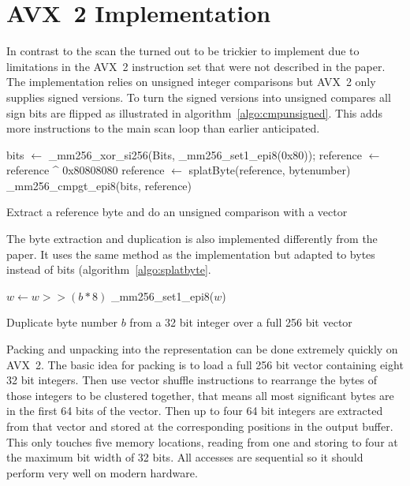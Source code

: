 \section{AVX~2 \bs{} Implementation}

In contrast to the \bwv{} scan the \bs{} turned out to be trickier to implement
due to limitations in the AVX~2 instruction set that were not described in the
\bs{} paper. The implementation relies on unsigned integer comparisons but AVX~2
only supplies signed versions. To turn the signed versions into unsigned
compares all sign bits are flipped as illustrated in
algorithm~\ref{algo:cmpunsigned}. This adds more instructions to the main scan
loop than earlier anticipated.

\begin{algorithm}[h]
\begin{algorithmic}[1]
  \State bits $\gets$ \_mm256\_xor\_si256(Bits, \_mm256\_set1\_epi8(0x80));
  \State reference $\gets$ reference \^{} 0x80808080
  \State reference $\gets$ splatByte(reference, bytenumber)
  \State \Return \_mm256\_cmpgt\_epi8(bits, reference)
  \EndProcedure
\end{algorithmic}
\caption{Extract a reference byte and do an unsigned comparison with a vector}
\label{algo:cmpunsigned}
\end{algorithm}

The byte extraction and duplication is also implemented differently from the
paper. It uses the same method as the \bwv{} implementation but adapted to bytes
instead of bits (algorithm~\ref{algo:splatbyte}.

\begin{algorithm}[h]
\begin{algorithmic}[1]
  \State $w \gets w >> (b * 8)$ 
  \State \Return \_mm256\_set1\_epi8($w$) 
  \EndProcedure
\end{algorithmic}
\caption{Duplicate byte number $b$ from a 32 bit integer over a full 256 bit vector}
\label{algo:splatbyte}
\end{algorithm}

Packing and unpacking into the \bs{} representation can be done extremely
quickly on AVX~2. The basic idea for packing is to load a full 256 bit vector
containing eight 32 bit integers. Then use vector shuffle instructions to
rearrange the bytes of those integers to be clustered together, that means all
most significant bytes are in the first 64 bits of the vector. Then up to four
64 bit integers are extracted from that vector and stored at the corresponding
positions in the output buffer. This only touches five memory locations, reading
from one and storing to four at the maximum bit width of 32 bits. All accesses
are sequential so it should perform very well on modern hardware.
